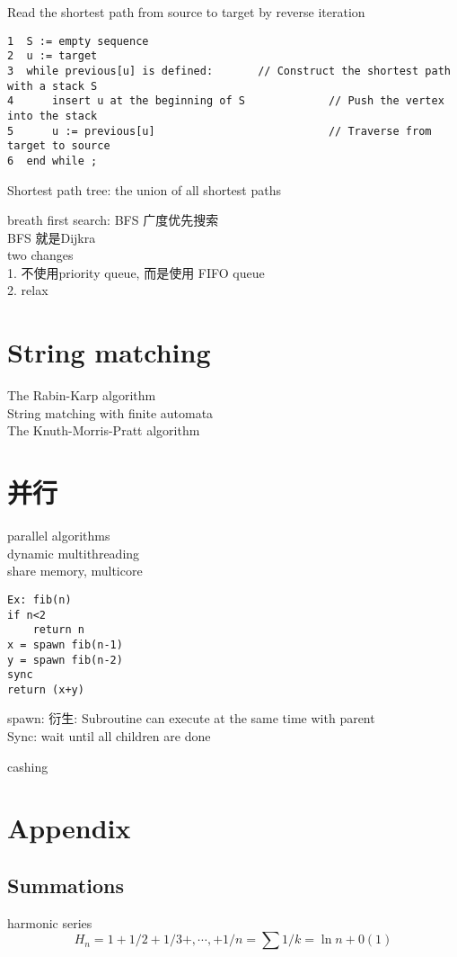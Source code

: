\documentclass{article}
\begin{document}
Read the shortest path from source to target by reverse iteration
\begin{verbatim}
1  S := empty sequence
2  u := target
3  while previous[u] is defined:       // Construct the shortest path with a stack S
4      insert u at the beginning of S             // Push the vertex into the stack
5      u := previous[u]                           // Traverse from target to source
6  end while ;
\end{verbatim}

\noindent
Shortest path tree: the union of all shortest paths

breath first search: BFS 广度优先搜索\\
BFS 就是Dijkra\\

two changes\\
1. 不使用priority queue, 而是使用 FIFO queue\\
2. relax

\section{String matching}
The Rabin-Karp algorithm\\
String matching with finite automata\\
The Knuth-Morris-Pratt algorithm

\section{并行}
\noindent
parallel algorithms\\
dynamic multithreading\\
share memory, multicore
\begin{verbatim}
Ex: fib(n)
if n<2
    return n
x = spawn fib(n-1)
y = spawn fib(n-2)
sync
return (x+y)
\end{verbatim}
spawn: 衍生: Subroutine can execute at the same time with parent\\
Sync: wait until all children are done

\noindent
cashing

\section{Appendix}
\subsection{Summations}
harmonic series
$$H_n = 1+1/2+1/3+,\cdots,+1/n=\sum 1/k=\ln n + 0(1)
$$
\end{document}
